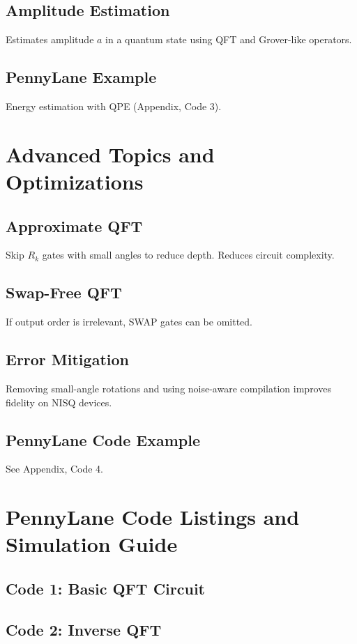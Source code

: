 \documentclass[12pt]{book}
\begin{document}
\section{Amplitude Estimation}
Estimates amplitude $a$ in a quantum state using QFT and Grover-like operators.

\section{PennyLane Example}
Energy estimation with QPE (Appendix, Code 3).

\chapter{Advanced Topics and Optimizations}

\section{Approximate QFT}
Skip $R_k$ gates with small angles to reduce depth. Reduces circuit complexity.

\section{Swap-Free QFT}
If output order is irrelevant, SWAP gates can be omitted.

\section{Error Mitigation}
Removing small-angle rotations and using noise-aware compilation improves fidelity on NISQ devices.

\section{PennyLane Code Example}
See Appendix, Code 4.

\appendix
\chapter{PennyLane Code Listings and Simulation Guide}

\section{Code 1: Basic QFT Circuit}


\section{Code 2: Inverse QFT}

\end{document}
